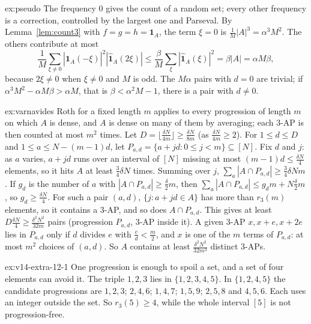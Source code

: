 \begin{solution}{ex:pseudo}
\idea The frequency $0$ gives the count of a random set; every other frequency is a correction, controlled by the largest one and Parseval.
\writeup By Lemma~\ref{lem:count3} with $f=g=h=\mathbf1_A$, the term $\xi=0$ is $\frac1M|A|^3=\alpha^3M^2$. The others contribute at most
\[
\frac1M\sum_{\xi\ne0}|\hat{\mathbf1}_A(-\xi)|^2|\hat{\mathbf1}_A(2\xi)|\le\frac\beta M\sum_\xi|\hat{\mathbf1}_A(\xi)|^2=\beta|A|=\alpha M\beta,
\]
because $2\xi\neq0$ when $\xi\ne0$ and $M$ is odd. The $M\alpha$ pairs with $d=0$ are trivial; if $\alpha^3M^2-\alpha M\beta>\alpha M$, that is $\beta<\alpha^2M-1$, there is a pair with $d\neq0$.
\end{solution}

\begin{solution}{ex:varnavides}
\idea Roth for a fixed length $m$ applies to every progression of length $m$ on which $A$ is dense, and $A$ is dense on many of them by averaging; each $3$-AP is then counted at most $m^2$ times.
\writeup Let $D=\lfloor\frac{\delta N}{4m}\rfloor\ge\frac{\delta N}{8m}$ (as $\frac{\delta N}{4m}\ge2$). For $1\le d\le D$ and $1\le a\le N-(m-1)d$, let $P_{a,d}=\{a+jd:0\le j<m\}\subseteq[N]$. Fix $d$ and $j$: as $a$ varies, $a+jd$ runs over an interval of $[N]$ missing at most $(m-1)d\le\frac{\delta N}4$ elements, so it hits $A$ at least $\frac34\delta N$ times. Summing over $j$, $\sum_a|A\cap P_{a,d}|\ge\frac34\delta Nm$. If $g_d$ is the number of $a$ with $|A\cap P_{a,d}|\ge\frac\delta2m$, then $\sum_a|A\cap P_{a,d}|\le g_dm+N\frac\delta2m$, so $g_d\ge\frac{\delta N}4$. For such a pair $(a,d)$, $\{j:a+jd\in A\}$ has more than $r_3(m)$ elements, so it contains a $3$-AP, and so does $A\cap P_{a,d}$. This gives at least $D\frac{\delta N}4\ge\frac{\delta^2N^2}{32m}$ pairs (progression $P_{a,d}$, $3$-AP inside it). A given $3$-AP $x,x+e,x+2e$ lies in $P_{a,d}$ only if $d$ divides $e$ with $\frac ed<\frac m2$, and $x$ is one of the $m$ terms of $P_{a,d}$: at most $m^2$ choices of $(a,d)$. So $A$ contains at least $\frac{\delta^2N^2}{32m^3}$ distinct $3$-APs.
\end{solution}

\begin{solution}{ex:v14-extra-12-1}
\idea One progression is enough to spoil a set, and a set of four elements can avoid it.
\writeup The triple $1,2,3$ lies in $\{1,2,3,4,5\}$. In $\{1,2,4,5\}$ the candidate progressions are $1,2,3$; $2,4,6$; $1,4,7$; $1,5,9$; $2,5,8$ and $4,5,6$. Each uses an integer outside the set. So $r_3(5)\ge4$, while the whole interval $[5]$ is not progression-free.
\end{solution}

